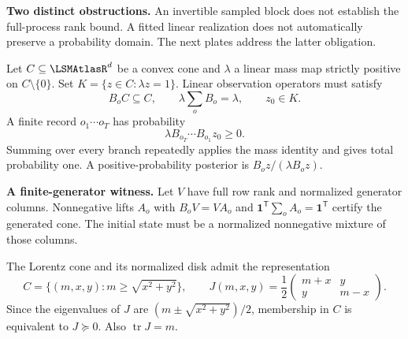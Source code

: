 \documentclass[11pt,oneside,openany]{book}
\numberwithin{equation}{section}
\begin{document}
\textbf{Two distinct obstructions.} An invertible sampled block does not establish the full-process rank bound. A fitted linear realization does not automatically preserve a probability domain. The next plates address the latter obligation.


Let $C\subseteq\LSMAtlasR^d$ be a convex cone and $\lambda$ a linear mass map strictly positive on $C\setminus\{0\}$. Set $K=\{z\in C:\lambda z=1\}$. Linear observation operators must satisfy
\[
B_oC\subseteq C,\qquad \lambda\sum_o B_o=\lambda,\qquad z_0\in K.
\]
A finite record $o_1\cdots o_T$ has probability
\[
\lambda B_{o_T}\cdots B_{o_1}z_0\geq0.
\]
Summing over every branch repeatedly applies the mass identity and gives total probability one. A positive-probability posterior is $B_oz/(\lambda B_oz)$.

\textbf{A finite-generator witness.} Let $V$ have full row rank and normalized generator columns. Nonnegative lifts $A_o$ with $B_oV=VA_o$ and $\mathbf1^{\mathsf T}\sum_oA_o=\mathbf1^{\mathsf T}$ certify the generated cone. The initial state must be a normalized nonnegative mixture of those columns.

The Lorentz cone and its normalized disk admit the representation
\[
C=\{(m,x,y):m\geq\sqrt{x^2+y^2}\},\qquad
J(m,x,y)=\frac12\begin{pmatrix}m+x&y\\y&m-x\end{pmatrix}.
\]
Since the eigenvalues of $J$ are $(m\pm\sqrt{x^2+y^2})/2$, membership in $C$ is equivalent to $J\succeq0$. Also $\operatorname{tr}J=m$.
\end{document}
